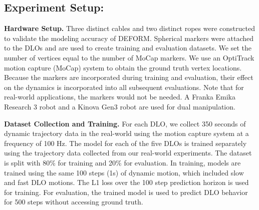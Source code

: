 \subsection{Experiment Setup:}
\textbf{Hardware Setup.}
Three distinct cables and two distinct ropes were constructed to validate the modeling accuracy of DEFORM.
Spherical markers were attached to the DLOs and are used to create training and evaluation datasets. 
We set the number of vertices equal to the number of MoCap markers. 
We use an OptiTrack motion capture (MoCap) system to obtain the ground truth vertex locations.
Because the markers are incorporated during training and evaluation, their effect on the dynamics is incorporated into all subsequent evaluations. 
Note that for real-world applications, the markers would not be needed.
A Franka Emika Research 3 robot and a Kinova Gen3 robot are used for dual manipulation. 

\textbf{Dataset Collection and Training.}
For each DLO, we collect 350 seconds of dynamic trajectory data in the real-world using the motion capture system at a frequency of 100 Hz. The model for each of the five DLOs is trained separately using the trajectory data collected from our real-world experiments.
The dataset is split with 80\% for training and 20\% for evaluation.
In training, models are trained using the same 100 steps (1s) of dynamic motion, which included slow and fast DLO motions.
The L1 loss over the 100 step prediction horizon is used for training.
For evaluation, the trained model is used to predict DLO behavior for 500 steps without accessing ground truth.

